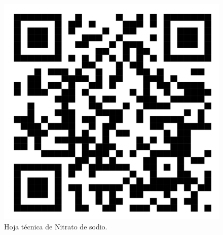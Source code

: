 \documentclass[12pt]{article}
\begin{document}
\begin{figure}[htbp]
\begin{minipage}{0.4\textwidth}
        \includegraphics[width=\linewidth]{Imagenes/S5506_NitratoSodio.png}
    \caption{Hoja técnica de Nitrato de sodio.}
    \label{fig:imagen4}
  \end{minipage}
\end{figure}
\end{document}

